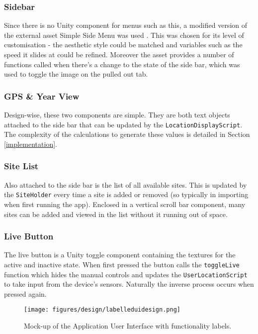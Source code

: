 \documentclass{article}
\begin{document}
\subsubsection{Sidebar}
Since there is no Unity component for menus such as this, a modified version of the external asset Simple Side Menu was used \cite{design:sidemenu}. This was chosen for its level of customisation - the aesthetic style could be matched and variables such as the speed it slides at could be refined. Moreover the asset provides a number of functions called when there's a change to the state of the side bar, which was used to toggle the image on the pulled out tab.

\subsubsection{GPS \& Year View}
Design-wise, these two components are simple. They are both text objects attached to the side bar that can be updated by the \verb|LocationDisplayScript|. The complexity of the calculations to generate these values is detailed in Section \ref{implementation}.

\subsubsection{Site List}
Also attached to the side bar is the list of all available sites. This is updated by the \verb|SiteHolder| every time a site is added or removed (so typically in importing when first running the app). Enclosed in a vertical scroll bar component, many sites can be added and viewed in the list without it running out of space.

\subsubsection{Live Button}
The live button is a Unity toggle component containing the textures for the active and inactive state. When first pressed the button calls the \verb|toggleLive| function which hides the manual controls and updates the \verb|UserLocationScript| to take input from the device's sensors. Naturally the inverse process occurs when pressed again.

\begin{figure}[h]
    \centering
    \texttt{[image: figures/design/labelleduidesign.png]}
        \caption{Mock-up of the Application User Interface with functionality labels.}
        \label{fig:uimockup}
\end{figure}
\end{document}
